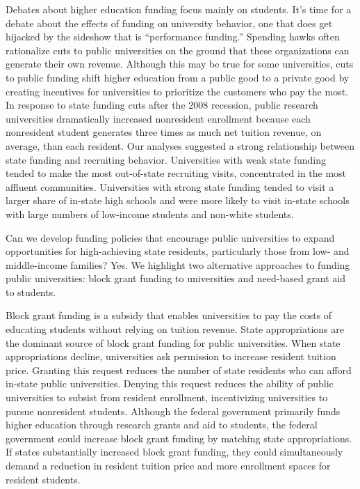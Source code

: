 \documentclass{article}
\begin{document}
Debates about higher education funding focus mainly on students. It's time for a debate about the effects of funding on university behavior, one that does get hijacked by the sideshow that is ``performance funding.'' Spending hawks often rationalize cuts to public universities on the ground that these organizations can generate their own revenue. Although this may be true for some universities, cuts to public funding shift higher education from a public good to a private good by creating incentives for universities to prioritize the customers who pay the most. In response to state funding cuts after the 2008 recession, public research universities dramatically increased nonresident enrollment because each nonresident student generates three times as much net tuition revenue, on average, than each resident. Our analyses suggested a strong relationship between state funding and recruiting behavior. Universities with weak state funding tended to make the most out-of-state recruiting visits, concentrated in the most affluent communities. Universities with strong state funding tended to visit a larger share of in-state high schools and were more likely to visit in-state schools with large numbers of low-income students and non-white students.

Can we develop funding policies that encourage public universities to expand opportunities for high-achieving state residents, particularly those from low- and middle-income families? Yes. We highlight two alternative approaches to funding public universities: block grant funding to universities and need-based grant aid to students.

Block grant funding is a subsidy that enables universities to pay the costs of educating students without relying on tuition revenue. State appropriations are the dominant source of block grant funding for public universities. When state appropriations decline, universities ask permission to increase resident tuition price. Granting this request reduces the number of state residents who can afford in-state public universities. Denying this request reduces the ability of public universities to subsist from resident enrollment, incentivizing universities to pursue nonresident students. Although the federal government primarily funds higher education through research grants and aid to students, the federal government could increase block grant funding by matching state appropriations.  If states substantially increased block grant funding, they could simultaneously demand a reduction in resident tuition price and more enrollment spaces for resident students.
\end{document}
